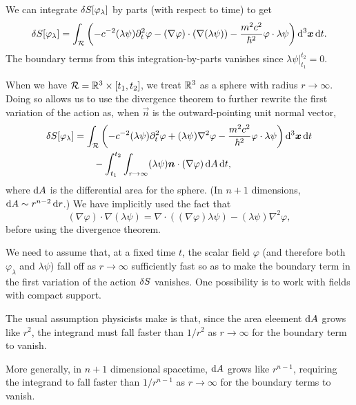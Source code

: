\M
We can integrate $\delta S[\varphi_{\lambda}]$ by parts (with
respect to time) to get
\begin{equation}
\delta S[\varphi_{\lambda}] = \int_{\mathcal{R}}\left(
-c^{-2}(\lambda\psi)\partial_{t}^{2}\varphi
-(\nabla\varphi)\cdot(\nabla(\lambda\psi))
-\frac{m^{2}c^{2}}{\hbar^{2}}\varphi\cdot\lambda\psi\right)\mathrm{d}^{3}\boldsymbol{x}\,\mathrm{d} t.
\end{equation}
The boundary terms from this integration-by-parts vanishes since
$\lambda\psi|^{t_{2}}_{t_{1}}=0$.

\M
When we have $\mathcal{R}=\mathbb{R}^{3}\times[t_{1},t_{2}]$, we treat
$\mathbb{R}^{3}$ as a sphere with radius $r\to\infty$. Doing so allows us to
use the divergence theorem to further rewrite the first variation of the
action as, when $\vec{n}$ is the outward-pointing unit normal vector,
\begin{equation}
\begin{split}
\delta\action[\varphi_{\lambda}] &= \int_{\mathcal{R}}\left(
-c^{-2}(\lambda\psi)\partial_{t}^{2}\varphi
+(\lambda\psi)\nabla^{2}\varphi
-\frac{m^{2}c^{2}}{\hbar^{2}}\varphi\cdot\lambda\psi\right)\D^{3}\vec{x}\,\D t\\
&\qquad-\int^{t_{2}}_{t_{1}}\int_{r\to\infty}(\lambda\psi)\vec{n}\cdot(\nabla\varphi)%
\,\D A\,\D t,
\end{split}
\end{equation}
where $\mathrm{d} A$ is the differential area for the sphere. (In $n+1$
dimensions, $\mathrm{d} A\sim r^{n-2}\,\mathrm{d} r$.)
We have implicitly used the fact that
\begin{equation}
(\nabla\varphi)\cdot\nabla(\lambda\psi)=\nabla\cdot((\nabla\varphi)\lambda\psi)
-(\lambda\psi)\nabla^{2}\varphi,
\end{equation}
before using the divergence theorem.

We need to assume that, at a fixed time $t$, the scalar field $\varphi$
(and therefore both $\varphi_{\lambda}$ and $\lambda\psi$) fall off as
$r\to\infty$ sufficiently fast so as to make the boundary term in the
first variation of the action $\delta S$ vanishes. One possibility
is to work with fields with compact support.

The usual assumption physicists make is that, since the area eleement
$\mathrm{d} A$ grows like $r^{2}$, the integrand must fall faster than $1/r^{2}$
as $r\to\infty$ for the boundary term to vanish.

More generally, in $n+1$ dimensional spacetime, $\mathrm{d} A$ grows like $r^{n-1}$,
requiring the integrand to fall faster than $1/r^{n-1}$ as $r\to\infty$
for the boundary terms to vanish.

